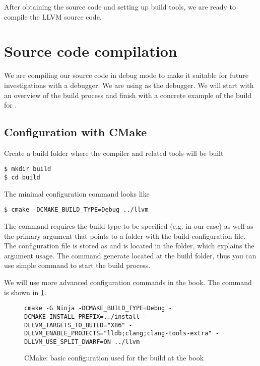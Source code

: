 After obtaining the source code and setting up build tools, we are ready to
compile the LLVM source code. 

\section{Source code compilation}

We are compiling our source code in debug mode to make it suitable for future
investigations with a debugger. We are using \lldb as the debugger. We will
start with an overview of the build process and finish with a concrete example
of the build for \lldb.

\subsection{Configuration with CMake}
\label{sec:config_with_cmake}
Create a build folder where the compiler and related tools will be built
\begin{adjustwidth}{0em}{0em}
\begin{verbatim}
$ mkdir build
$ cd build
\end{verbatim}
\end{adjustwidth}
The minimal configuration command looks like
\begin{adjustwidth}{0em}{0em}
\begin{verbatim}
$ cmake -DCMAKE_BUILD_TYPE=Debug ../llvm 
\end{verbatim}
\end{adjustwidth}
The command requires the build type to be specified (e.g.  in our
case) 
as well as the primary argument that points to a folder with the build
configuration file. The configuration file is stored as 
and is located in the  folder, which explains the
 argument usage. The command generate 
located at the build folder, thus you can use simple  command to start
the build process.

We will use more advanced configuration commands in the book. The command is
shown in  \cref{lis:basic_config}.
\begin{figure}[H]
\begin{verbatim}
cmake -G Ninja -DCMAKE_BUILD_TYPE=Debug -DCMAKE_INSTALL_PREFIX=../install -DLLVM_TARGETS_TO_BUILD="X86" -DLLVM_ENABLE_PROJECTS="lldb;clang;clang-tools-extra" -DLLVM_USE_SPLIT_DWARF=ON ../llvm
\end{verbatim}
\caption{CMake: basic configuration used for the build at the book}
\label{lis:basic_config}
\end{figure}

